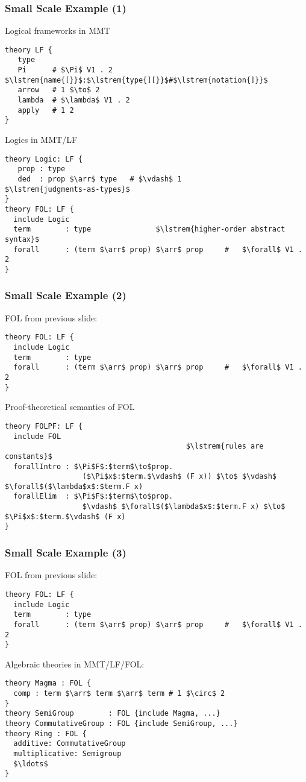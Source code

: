 \documentclass{beamer}
\begin{document}
\newcommand{\lstrem}[1]{{\color{blue}\text{#1}}}

\begin{frame}[fragile]\frametitle{Small Scale Example (1)}
Logical frameworks in MMT
\begin{lstlisting}[frame=single]
theory LF {
   type
   Pi      # $\Pi$ V1 . 2                  $\lstrem{name{[}}$:$\lstrem{type{][}}$#$\lstrem{notation{]}}$
   arrow   # 1 $\to$ 2
   lambda  # $\lambda$ V1 . 2
   apply   # 1 2
}
\end{lstlisting}

Logics in MMT/LF
\begin{lstlisting}[frame=single]
theory Logic: LF {
   prop : type
   ded  : prop $\arr$ type   # $\vdash$ 1              $\lstrem{judgments-as-types}$
}
theory FOL: LF {
  include Logic
  term        : type               $\lstrem{higher-order abstract syntax}$
  forall      : (term $\arr$ prop) $\arr$ prop     #   $\forall$ V1 . 2
}
\end{lstlisting}
\end{frame}

\begin{frame}[fragile]\frametitle{Small Scale Example (2)}
FOL from previous slide:
\begin{lstlisting}[frame=single]
theory FOL: LF {
  include Logic
  term        : type
  forall      : (term $\arr$ prop) $\arr$ prop     #   $\forall$ V1 . 2
}
\end{lstlisting}

Proof-theoretical semantics of FOL
\begin{lstlisting}[frame=single]
theory FOLPF: LF {
  include FOL
                                          $\lstrem{rules are constants}$
  forallIntro : $\Pi$F$:$term$\to$prop.
                  ($\Pi$x$:$term.$\vdash$ (F x)) $\to$ $\vdash$ $\forall$($\lambda$x$:$term.F x)
  forallElim  : $\Pi$F$:$term$\to$prop.
                  $\vdash$ $\forall$($\lambda$x$:$term.F x) $\to$ $\Pi$x$:$term.$\vdash$ (F x)
}
\end{lstlisting}
\end{frame}

\begin{frame}[fragile]\frametitle{Small Scale Example (3)}
FOL from previous slide:
\begin{lstlisting}[frame=single]
theory FOL: LF {
  include Logic
  term        : type
  forall      : (term $\arr$ prop) $\arr$ prop     #   $\forall$ V1 . 2
}
\end{lstlisting}

Algebraic theories in MMT/LF/FOL:
\begin{lstlisting}[frame=single]
theory Magma : FOL {
  comp : term $\arr$ term $\arr$ term # 1 $\circ$ 2
}
theory SemiGroup        : FOL {include Magma, ...}
theory CommutativeGroup : FOL {include SemiGroup, ...}
theory Ring : FOL {
  additive: CommutativeGroup
  multiplicative: Semigroup
  $\ldots$
}
\end{lstlisting}
\end{frame}
\end{document}
